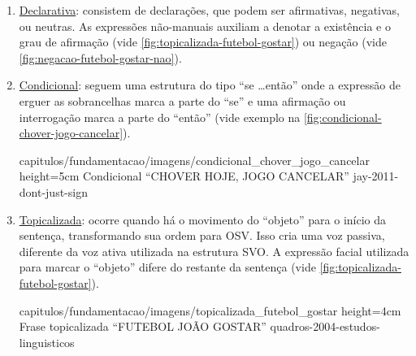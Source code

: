 \begin{enumerate}
\begin{enumerate}
        \item \underline{Declarativa}: consistem de declarações, que podem ser afirmativas, negativas, ou neutras. As expressões não-manuais auxiliam a denotar a existência e o grau de afirmação (vide \autoref{fig:topicalizada-futebol-gostar}) ou negação (vide \autoref{fig:negacao-futebol-gostar-nao}).



        \item \underline{Condicional}: seguem uma estrutura do tipo ``se \dots então'' onde a expressão de erguer as sobrancelhas marca a parte do ``se'' e uma afirmação ou interrogação marca a parte do ``então'' (vide exemplo na \autoref{fig:condicional-chover-jogo-cancelar}).
        
            {capitulos/fundamentacao/imagens/condicional_chover_jogo_cancelar} %
            {height=5cm} %
            {Condicional ``CHOVER HOJE, JOGO CANCELAR''} %
            {jay-2011-dont-just-sign} %

        \item \underline{Topicalizada}: ocorre quando há o movimento do ``objeto'' para o início da sentença, transformando sua ordem para OSV. Isso cria uma voz passiva, diferente da voz ativa utilizada na estrutura SVO.
        A expressão facial utilizada para marcar o ``objeto'' difere do restante da sentença (vide \autoref{fig:topicalizada-futebol-gostar}).
        
            {capitulos/fundamentacao/imagens/topicalizada_futebol_gostar} %
            {height=4cm} %
            {Frase topicalizada ``FUTEBOL JOÃO GOSTAR''} %
            {quadros-2004-estudos-linguisticos} %




\end{enumerate}
\end{enumerate}
